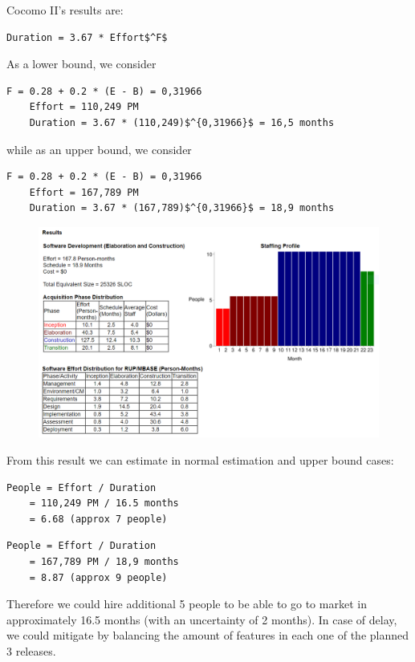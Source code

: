 \documentclass[english]{article}
\begin{document}
Cocomo II's results are:
\begin{lstlisting}[mathescape, numbers=none]
	Duration = 3.67 * Effort$^F$
\end{lstlisting}
As a lower bound, we consider
\begin{lstlisting}[mathescape, numbers=none]
	F = 0.28 + 0.2 * (E - B) = 0,31966
	Effort = 110,249 PM 
	Duration = 3.67 * (110,249)$^{0,31966}$ = 16,5 months
\end{lstlisting}
while as an upper bound, we consider
\begin{lstlisting}[mathescape, numbers=none]
	F = 0.28 + 0.2 * (E - B) = 0,31966
	Effort = 167,789 PM 
	Duration = 3.67 * (167,789)$^{0,31966}$ = 18,9 months
\end{lstlisting}
\begin{figure}[H]
			\centering
			\includegraphics[scale=0.55]{./Images/COCOMOutput18.png} 
		\end{figure}


From this result we can estimate in normal estimation and upper bound cases:
\begin{lstlisting}[mathescape, numbers=none]
 People = Effort / Duration 
	= 110,249 PM / 16.5 months 
	= 6.68 (approx 7 people)
\end{lstlisting}
\begin{lstlisting}[mathescape, numbers=none]
 People = Effort / Duration 
	= 167,789 PM / 18,9 months 
	= 8.87 (approx 9 people)
\end{lstlisting}
Therefore we could hire additional 5 people to be able to go to market in approximately 16.5 months (with an uncertainty of 2 months).
In case of delay, we could mitigate by balancing the amount of features in each one of the planned 3 releases.
\end{document}
